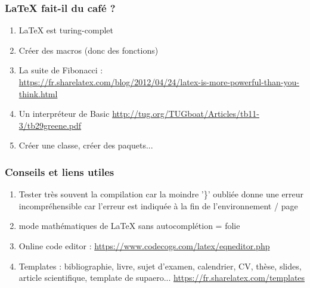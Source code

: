 \documentclass{beamer}
\begin{document}
\begin{frame}
    \frametitle{LaTeX fait-il du café ?}
    \begin{enumerate}
        \item<1-> LaTeX est turing-complet
        \item<2-> Créer des macros (donc des fonctions)        
        \item<3-> La suite de Fibonacci :\\
        \url{https://fr.sharelatex.com/blog/2012/04/24/latex-is-more-powerful-than-you-think.html}
        \item<4-> Un interpréteur de Basic
        \url{http://tug.org/TUGboat/Articles/tb11-3/tb29greene.pdf}
        \item<5-> Créer une classe, créer des paquets...
    \end{enumerate}
\end{frame}

\begin{frame}[fragile]
    \frametitle{Conseils et liens utiles}
    \begin{enumerate}
        \item<1-> Tester très souvent la compilation car la moindre '\}' oubliée donne une erreur incompréhensible car l'erreur est indiquée à la fin de l'environnement / page 
        \item<2-> mode mathématiques de LaTeX sans autocomplétion = folie
        \item<3-> Online code editor : \url{https://www.codecogs.com/latex/eqneditor.php}
        \item<4-> Templates : bibliographie, livre, sujet d'examen, calendrier, CV, thèse, slides, article scientifique, template de supaero...
        \url{https://fr.sharelatex.com/templates}
    \end{enumerate}
\end{frame}
\end{document}
